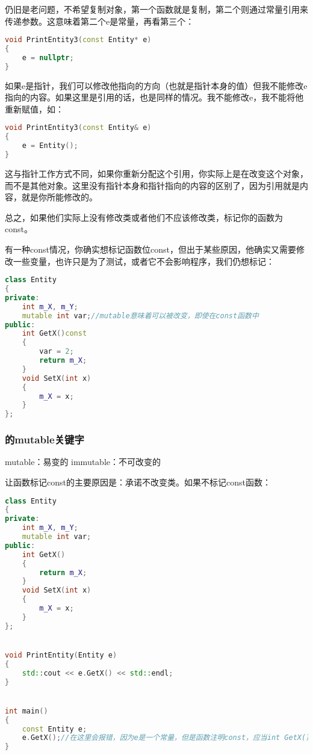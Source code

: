 仍旧是老问题，不希望复制对象，第一个函数就是复制，第二个则通过常量引用来传递参数。这意味着第二个{\ncodestyle e}是常量，再看第三个：

\begin{lstlisting}[language=c++]
void PrintEntity3(const Entity* e)
{
    e = nullptr;
}
\end{lstlisting}

如果{\ncodestyle e}是指针，我们可以修改他指向的方向（也就是指针本身的值）但我不能修改{\ncodestyle e}指向的内容。如果这里是引用的话，也是同样的情况。我不能修改{\ncodestyle e}，我不能将他重新赋值，如：

\begin{lstlisting}[language=c++]
void PrintEntity3(const Entity& e)
{
    e = Entity();
}
\end{lstlisting}

这与指针工作方式不同，如果你重新分配这个引用，你实际上是在改变这个对象，而不是其他对象。这里没有指针本身和指针指向的内容的区别了，因为引用就是内容，就是你所能修改的。

总之，如果他们实际上没有修改类或者他们不应该修改类，标记你的函数为{\ncodestyle const}。

有一种{\ncodestyle const}情况，你确实想标记函数位{\ncodestyle const}，但出于某些原因，他确实又需要修改一些变量，也许只是为了测试，或者它不会影响程序，我们仍想标记：

\begin{lstlisting}[language=c++]
class Entity
{
private:
    int m_X, m_Y;
    mutable int var;//mutable意味着可以被改变，即使在const函数中
public:
    int GetX()const
    {
        var = 2;
        return m_X;
    }
    void SetX(int x)
    {
        m_X = x;
    }
};
\end{lstlisting}
    
\subsubsection{的mutable关键字}

mutable：易变的
immutable：不可改变的

让函数标记{\ncodestyle const}的主要原因是：承诺不改变类。如果不标记{\ncodestyle const}函数：

\begin{lstlisting}[language=c++]
class Entity
{
private:
    int m_X, m_Y;
    mutable int var;
public:
    int GetX()
    {
        return m_X;
    }
    void SetX(int x)
    {
        m_X = x;
    }
};


void PrintEntity(Entity e)
{
    std::cout << e.GetX() << std::endl;
}


int main()
{
    const Entity e;
    e.GetX();//在这里会报错，因为e是一个常量，但是函数注明const，应当int GetX()const才可以
}
\end{lstlisting}


